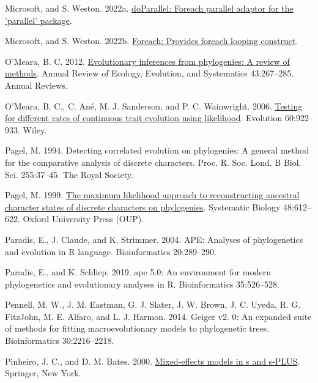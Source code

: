 \documentclass[fleqn,10pt,lineno]{wlpeerj} %
\newlength{\cslhangindent}
\newenvironment{CSLReferences}[2] %
 {\begin{list}{}{%
  \setlength{\itemindent}{0pt}
  \setlength{\leftmargin}{0pt}
  \setlength{\parsep}{0pt}
  \ifodd #1
   \setlength{\leftmargin}{\cslhangindent}
   \setlength{\itemindent}{-1\cslhangindent}
  \fi
  \setlength{\itemsep}{#2\baselineskip}}}
 {\end{list}}
\begin{document}
\begin{CSLReferences}{1}{0}
Microsoft, and S. Weston. 2022a. \href{https://CRAN.R-project.org/package=doParallel}{doParallel: Foreach parallel adaptor for the 'parallel' package}.

Microsoft, and S. Weston. 2022b. \href{https://CRAN.R-project.org/package=foreach}{Foreach: Provides foreach looping construct}.

O'Meara, B. C. 2012. \href{https://doi.org/10.1146/annurev-ecolsys-110411-160331}{Evolutionary inferences from phylogenies: A review of methods}. Annual Review of Ecology, Evolution, and Systematics 43:267--285. Annual Reviews.

O'Meara, B. C., C. Ané, M. J. Sanderson, and P. C. Wainwright. 2006. \href{https://doi.org/10.1111/j.0014-3820.2006.tb01171.x}{Testing for different rates of continuous trait evolution using likelihood}. Evolution 60:922--933. Wiley.

Pagel, M. 1994. Detecting correlated evolution on phylogenies: A general method for the comparative analysis of discrete characters. Proc. R. Soc. Lond. B Biol. Sci. 255:37--45. The Royal Society.

Pagel, M. 1999. \href{https://doi.org/10.1080/106351599260184}{The maximum likelihood approach to reconstructing ancestral character states of discrete characters on phylogenies}. Systematic Biology 48:612--622. Oxford University Press (OUP).

Paradis, E., J. Claude, and K. Strimmer. 2004. {APE}: Analyses of phylogenetics and evolution in {R} language. Bioinformatics 20:289--290.

Paradis, E., and K. Schliep. 2019. {ape} 5.0: An environment for modern phylogenetics and evolutionary analyses in {R}. Bioinformatics 35:526--528.

Pennell, M. W., J. M. Eastman, G. J. Slater, J. W. Brown, J. C. Uyeda, R. G. FitzJohn, M. E. Alfaro, and L. J. Harmon. 2014. Geiger v2. 0: An expanded suite of methods for fitting macroevolutionary models to phylogenetic trees. Bioinformatics 30:2216--2218.

Pinheiro, J. C., and D. M. Bates. 2000. \href{https://doi.org/10.1007/b98882}{Mixed-effects models in s and s-PLUS}. Springer, New York.


\end{CSLReferences}
\end{document}
